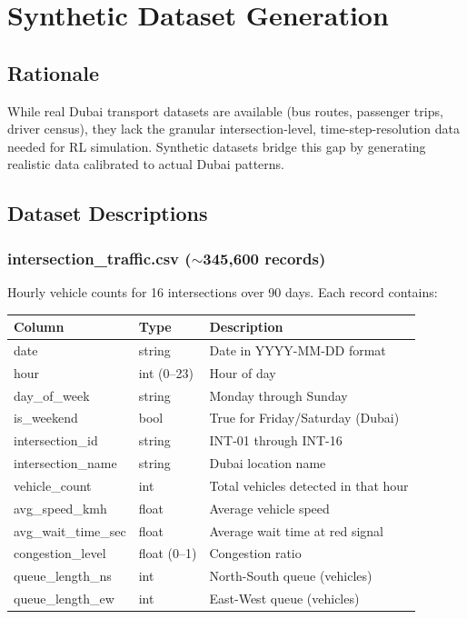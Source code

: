 \documentclass[12pt, a4paper]{article}
\begin{document}
\section{Synthetic Dataset Generation}

\subsection{Rationale}

While real Dubai transport datasets are available (bus routes, passenger trips, driver census), they lack the granular intersection-level, time-step-resolution data needed for RL simulation. Synthetic datasets bridge this gap by generating realistic data calibrated to actual Dubai patterns.

\subsection{Dataset Descriptions}

\subsubsection{intersection\_traffic.csv ($\sim$345,600 records)}

Hourly vehicle counts for 16 intersections over 90 days. Each record contains:

\begin{longtable}{p{4cm}p{2.5cm}p{5.5cm}}
    \toprule
    \textbf{Column} & \textbf{Type} & \textbf{Description} \\
    \midrule
    date & string & Date in YYYY-MM-DD format \\
    hour & int (0--23) & Hour of day \\
    day\_of\_week & string & Monday through Sunday \\
    is\_weekend & bool & True for Friday/Saturday (Dubai) \\
    intersection\_id & string & INT-01 through INT-16 \\
    intersection\_name & string & Dubai location name \\
    vehicle\_count & int & Total vehicles detected in that hour \\
    avg\_speed\_kmh & float & Average vehicle speed \\
    avg\_wait\_time\_sec & float & Average wait time at red signal \\
    congestion\_level & float (0--1) & Congestion ratio \\
    queue\_length\_ns & int & North-South queue (vehicles) \\
    queue\_length\_ew & int & East-West queue (vehicles) \\
    \bottomrule
\end{longtable}
\end{document}
